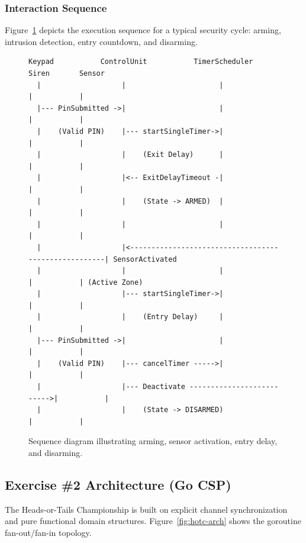 \documentclass[11pt,a4paper]{article}
\begin{document}
\subsubsection{Interaction Sequence}

Figure~\ref{fig:shas-sequence} depicts the execution sequence for a typical security cycle: arming, intrusion detection, entry countdown, and disarming.

\begin{figure}[h]
\centering
\begin{small}
\begin{verbatim}
Keypad           ControlUnit           TimerScheduler          Siren       Sensor
  |                   |                      |                   |           |
  |--- PinSubmitted ->|                      |                   |           |
  |    (Valid PIN)    |--- startSingleTimer->|                   |           |
  |                   |    (Exit Delay)      |                   |           |
  |                   |<-- ExitDelayTimeout -|                   |           |
  |                   |    (State -> ARMED)  |                   |           |
  |                   |                      |                   |           |
  |                   |<-----------------------------------------------------| SensorActivated
  |                   |                      |                   |           | (Active Zone)
  |                   |--- startSingleTimer->|                   |           |
  |                   |    (Entry Delay)     |                   |           |
  |--- PinSubmitted ->|                      |                   |           |
  |    (Valid PIN)    |--- cancelTimer ----->|                   |           |
  |                   |--- Deactivate -------------------------->|           |
  |                   |    (State -> DISARMED)                   |           |
\end{verbatim}
\end{small}
\caption{Sequence diagram illustrating arming, sensor activation, entry delay, and disarming.}
\label{fig:shas-sequence}
\end{figure}

\subsection{Exercise \#2 Architecture (Go CSP)}

The Heads-or-Tails Championship is built on explicit channel synchronization and pure functional domain structures. Figure~\ref{fig:hotc-arch} shows the goroutine fan-out/fan-in topology.
\end{document}
